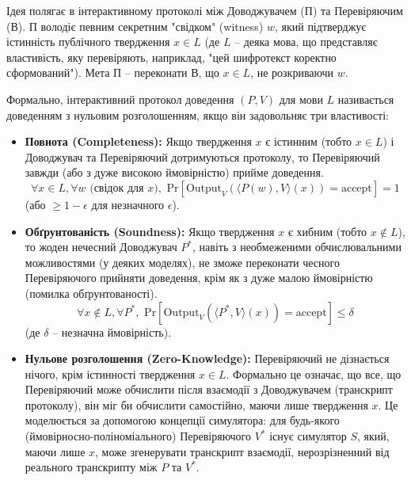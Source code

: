 \documentclass[a4paper,12pt]{article}
\begin{document}
    Ідея полягає в інтерактивному протоколі між Доводжувачем (П) та Перевіряючим (В). П володіє певним секретним "свідком" (witness) \(w\), який підтверджує істинність публічного твердження \(x \in L\) (де \(L\) -- деяка мова, що представляє властивість, яку перевіряють, наприклад, "цей шифротекст коректно сформований"). Мета П -- переконати В, що \(x \in L\), не розкриваючи \(w\).

    Формально, інтерактивний протокол доведення \((P, V)\) для мови \(L\) називається доведенням з нульовим розголошенням, якщо він задовольняє три властивості:
    \begin{itemize}
        \item \textbf{Повнота (Completeness):} Якщо твердження \(x\) є істинним (тобто \(x \in L\)) і Доводжувач та Перевіряючий дотримуються протоколу, то Перевіряючий завжди (або з дуже високою ймовірністю) прийме доведення.
        \[ \forall x \in L, \forall w \text{ (свідок для } x \text{)}, \text{ Pr}[\text{Output}_V(\langle P(w), V \rangle(x)) = \text{accept}] = 1 \]
        (або \( \ge 1 - \epsilon \) для незначного \(\epsilon\)).
        \item \textbf{Обґрунтованість (Soundness):} Якщо твердження \(x\) є хибним (тобто \(x \notin L\)), то жоден нечесний Доводжувач \(P^*\), навіть з необмеженими обчислювальними можливостями (у деяких моделях), не зможе переконати чесного Перевіряючого прийняти доведення, крім як з дуже малою ймовірністю (помилка обґрунтованості).
        \[ \forall x \notin L, \forall P^*, \text{ Pr}[\text{Output}_V(\langle P^*, V \rangle(x)) = \text{accept}] \le \delta \]
        (де \(\delta\) -- незначна ймовірність).
        \item \textbf{Нульове розголошення (Zero-Knowledge):} Перевіряючий не дізнається нічого, крім істинності твердження \(x \in L\). Формально це означає, що все, що Перевіряючий може обчислити після взаємодії з Доводжувачем (транскрипт протоколу), він міг би обчислити самостійно, маючи лише твердження \(x\). Це моделюється за допомогою концепції симулятора: для будь-якого (ймовірносно-поліноміального) Перевіряючого \(V^*\) існує симулятор \(S\), який, маючи лише \(x\), може згенерувати транскрипт взаємодії, нерозрізненний від реального транскрипту між \(P\) та \(V^*\).
    \end{itemize}
\end{document}
